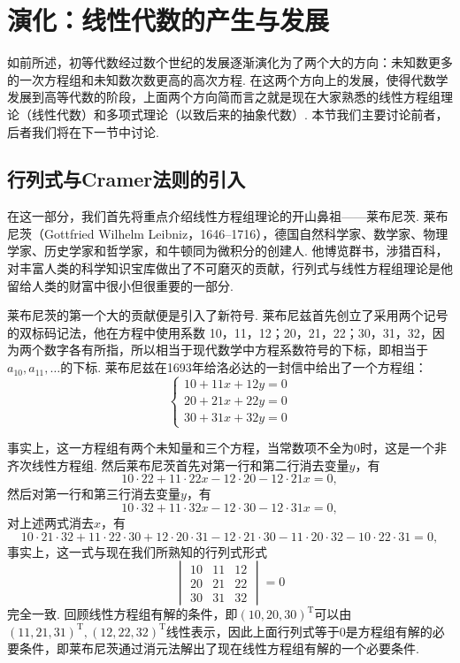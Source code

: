 \section{演化：线性代数的产生与发展}

如前所述，初等代数经过数个世纪的发展逐渐演化为了两个大的方向：未知数更多的一次方程组和未知数次数更高的高次方程. 在这两个方向上的发展，使得代数学发展到高等代数的阶段，上面两个方向简而言之就是现在大家熟悉的线性方程组理论（线性代数）和多项式理论（以致后来的抽象代数）. 本节我们主要讨论前者，后者我们将在下一节中讨论.

\subsection{行列式与Cramer法则的引入}

在这一部分，我们首先将重点介绍线性方程组理论的开山鼻祖——莱布尼茨. 莱布尼茨（Gottfried Wilhelm Leibniz，1646--1716），德国自然科学家、数学家、物理学家、历史学家和哲学家，和牛顿同为微积分的创建人. 他博览群书，涉猎百科，对丰富人类的科学知识宝库做出了不可磨灭的贡献，行列式与线性方程组理论是他留给人类的财富中很小但很重要的一部分.

莱布尼茨的第一个大的贡献便是引入了新符号. 莱布尼兹首先创立了采用两个记号的双标码记法，他在方程中使用系数
10，11，12；20，21，22；30，31，32，因为两个数字各有所指，所以相当于现代数学中方程系数符号的下标，即相当于$a_{10},a_{11},\ldots$的下标. 莱布尼兹在1693年给洛必达的一封信中给出了一个方程组：
\[\begin{cases}
        10+11x+12y=0 \\
        20+21x+22y=0 \\
        30+31x+32y=0
    \end{cases}\]

事实上，这一方程组有两个未知量和三个方程，当常数项不全为0时，这是一个非齐次线性方程组. 然后莱布尼茨首先对第一行和第二行消去变量$y$，有
\[10\cdot 22+11\cdot 22x-12\cdot 20-12\cdot 21x=0,\]
然后对第一行和第三行消去变量$y$，有
\[10\cdot 32+11\cdot 32x-12\cdot 30-12\cdot 31x=0,\]
对上述两式消去$x$，有
\[10\cdot 21\cdot 32+11\cdot 22\cdot 30+12\cdot 20\cdot 31-12\cdot 21\cdot 30-11\cdot 20\cdot 32-10\cdot 22\cdot 31=0,\]
事实上，这一式与现在我们所熟知的行列式形式
\[\begin{vmatrix}
        10 & 11 & 12 \\
        20 & 21 & 22 \\
        30 & 31 & 32
    \end{vmatrix}=0\]
完全一致. 回顾线性方程组有解的条件，即$(10,20,30)^\mathrm{T}$可以由$(11,21,31)^\mathrm{T},(12,22,32)^\mathrm{T}$线性表示，因此上面行列式等于0是方程组有解的必要条件，即莱布尼茨通过消元法解出了现在线性方程组有解的一个必要条件.

